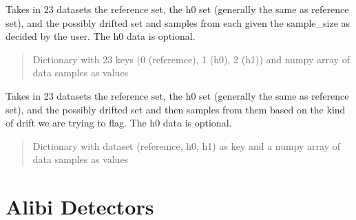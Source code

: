 \documentclass[letterpaper,10pt,english]{sphinxmanual}
\begin{document}
\begin{fulllineitems}
\begin{fulllineitems}
\label{\detokenize{baseModules/sampling:sampling.samplingData.sample_data_sudden}}
\pysigstartsignatures
{}
\pysigstopsignatures
\sphinxAtStartPar
Takes in 2\sphinxhyphen{}3 datasets \sphinxhyphen{} the reference set, the h0 set (generally the same as reference set),
and the possibly drifted set and samples from each given the sample\_size as decided by the
user. The h0 data is optional.
\begin{quote}\begin{description}
\sphinxAtStartPar
Dictionary with 2\sphinxhyphen{}3 keys (0 (referemce), 1 (h0), 2 (h1)) and numpy array of data samples as values

\end{description}\end{quote}

\end{fulllineitems}


\begin{fulllineitems}
\label{\detokenize{baseModules/sampling:sampling.samplingData.samples}}
\pysigstartsignatures
{}
\pysigstopsignatures
\sphinxAtStartPar
Takes in 2\sphinxhyphen{}3 datasets \sphinxhyphen{} the reference set, the h0 set (generally the same as reference set),
and the possibly drifted set and then samples from them based on the kind of drift we are
trying to flag. The h0 data is optional.
\begin{quote}\begin{description}
\sphinxAtStartPar
Dictionary with dataset (referemce, h0, h1) as key and a numpy array of data samples as values

\end{description}\end{quote}

\end{fulllineitems}


\end{fulllineitems}


\sphinxstepscope


\chapter{Alibi Detectors}
\label{\detokenize{alibiModules/modules:alibi-detectors}}\label{\detokenize{alibiModules/modules::doc}}
\sphinxstepscope
\end{document}
